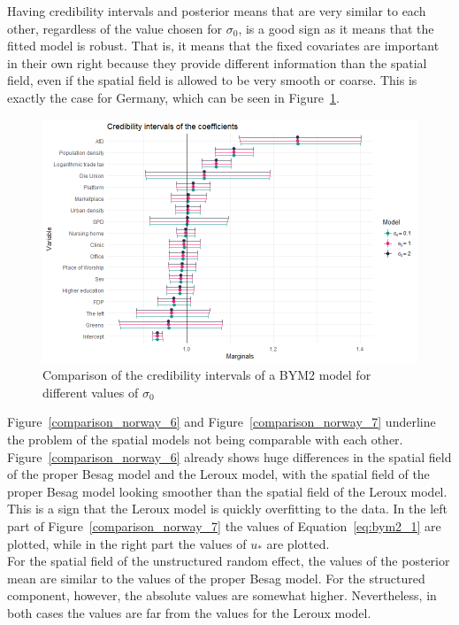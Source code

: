 Having credibility intervals and posterior means that are very similar to each other, regardless of the value chosen for $\sigma_0$, is a good sign as it means that the fitted model is robust. That is, it means that the fixed covariates are important in their own right because they provide different information than the spatial field, even if the spatial field is allowed to be very smooth or coarse. This is exactly the case for Germany, which can be seen in Figure~\ref{comparison_germany_5}. \clearpage
\begin{figure}[H]
    \centering
    \includegraphics[width = \textwidth]{intervals_prior_germany.png}
    \caption{Comparison of the credibility intervals of a BYM2 model for different values of $\sigma_0$}
    \label{comparison_germany_5}
\end{figure}
Figure~\ref{comparison_norway_6} and Figure~\ref{comparison_norway_7} underline the problem of the spatial models not being comparable with each other. Figure~\ref{comparison_norway_6} already shows huge differences in the spatial field of the proper Besag model and the Leroux model, with the spatial field of the proper Besag model looking smoother than the spatial field of the Leroux model. This is a sign that the Leroux model is quickly overfitting to the data.
In the left part of Figure~\ref{comparison_norway_7} the values of Equation~\ref{eq:bym2_1} are plotted, while in the right part the values of $u_{*}$ are plotted. \\
For the spatial field of the unstructured random effect, the values of the posterior mean are similar to the values of the proper Besag model. For the structured component, however, the absolute values are somewhat higher. Nevertheless, in both cases the values are far from the values for the Leroux model. \clearpage
